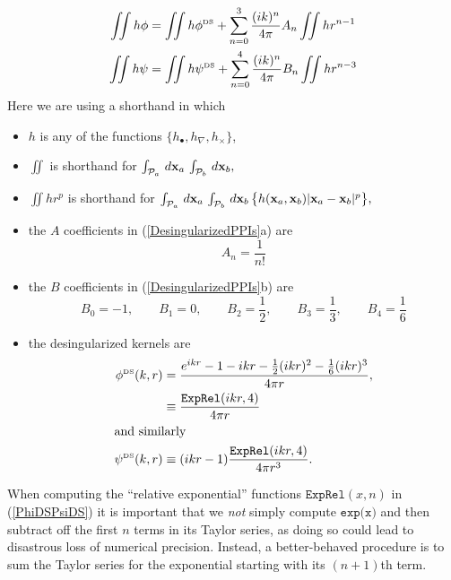 \documentclass[dvips,letterpaper]{article}
\begin{document}
\begin{subequations}
\begin{align}
 \iint h \phi
&=
 \iint h \phi^{\hbox{\tiny{DS}}}
+\sum_{n=0}^3 \frac{(ik)^n}{4\pi} A_n  
 \iint h r^{n-1}
\\
 \iint h\psi
&=
 \iint h\psi^{\hbox{\tiny{DS}}}
+\sum_{n=0}^4 \frac{(ik)^n}{4\pi} B_n 
 \iint h r^{n-3}
\end{align}
\label{DesingularizedPPIs}
\end{subequations}
Here we are using a shorthand in which 
\begin{itemize}
 \item $h$ is any of the functions $\{h_\bullet, h_\nabla, h_\times\}$,
 \item $\iint$ is shorthand for 
       $\int_{\mathcal{P}_a} \, d\mathbf{x}_a \, \int_{\mathcal{P}_b} \, d\mathbf{x}_b, $
 \item $\iint h r^p$ is shorthand for 
       $\int_{\mathcal{P}_a} \, d\mathbf{x}_a \, \int_{\mathcal{P}_b} \, d\mathbf{x}_b\,
        \big\{h(\mathbf{x}_a, \mathbf{x}_b) |\mathbf{x}_a - \mathbf{x}_b|^p\big\},$
 \item the $A$ coefficients in (\ref{DesingularizedPPIs}a) are 
       $$A_n=\frac{1}{n!}$$
 \item the $B$ coefficients in (\ref{DesingularizedPPIs}b) are 
       $$ B_0 = -1, \qquad B_1 = 0, \qquad B_2 = \frac{1}{2}, \qquad
          B_3 = \frac{1}{3}, \qquad B_4 = \frac{1}{6}
       $$
 \item the desingularized kernels are 
\begin{subequations}
\begin{align}
\phi^{\hbox{\tiny{DS}}}(k, r) 
 &=
\frac{e^{ikr} - 1 - ikr - \frac{1}{2}(ikr)^2 - \frac{1}{6}(ikr)^3 }
     {4\pi r}, 
\nonumber \\
&\equiv\frac{\texttt{ExpRel}(ikr, 4)}{4\pi r}
\\
\intertext{and similarly}
\psi^{\hbox{\tiny{DS}}}(k, r)&\equiv(ikr-1)\frac{\texttt{ExpRel}(ikr, 4)}{4\pi r^3}.
\end{align}
\label{PhiDSPsiDS}
\end{subequations}
\end{itemize}
When computing the ``relative exponential'' functions 
$\texttt{ExpRel}(x,n)$ in (\ref{PhiDSPsiDS}) it is 
important that we \textit{not} simply compute 
$\texttt{exp(x)}$ and then subtract off the first $n$ terms
in its Taylor series, as doing so could lead to disastrous loss
of numerical precision. Instead, a better-behaved procedure is 
to sum the Taylor series for the exponential starting with 
its $(n+1)$th term.
\end{document}
